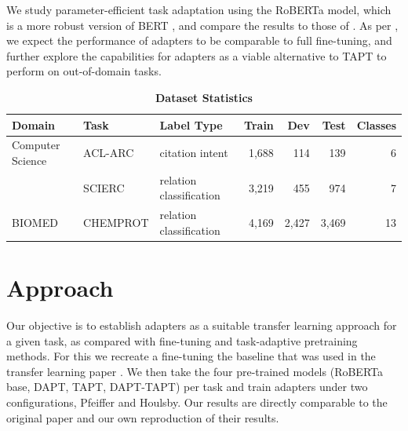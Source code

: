 \documentclass[10pt,twocolumn,letterpaper]{article}
\begin{document}
We study parameter-efficient task adaptation using the RoBERTa model, which is a more robust version of BERT \cite{liu2019roberta}, and compare the results to those of \cite{gururangan2020dont}. As per \cite{houlsby2019parameter}, we expect the performance of adapters to be comparable to full fine-tuning, and further explore the capabilities for adapters as a viable alternative to TAPT to perform on out-of-domain tasks.

\begin{table}[h]
    \centering
    \begin{tabular}{ l l l r r r r }
      \hline
      \textbf{Domain} & \textbf{Task} & \textbf{Label Type} & \textbf{Train} & \textbf{Dev}   & \textbf{Test}  & \textbf{Classes} \\
      \hline
      Computer Science & ACL-ARC & citation intent & 1,688 & 114   & 139   & 6 \\
                       & SCIERC  & relation classification & 3,219 & 455   & 974   & 7 \\
      \hline
      BIOMED           & CHEMPROT & relation classification & 4,169 & 2,427 & 3,469 & 13 \\
      \hline
    \end{tabular}%
    \caption{\textbf{Dataset Statistics}}
    \label{tab:dataset-stats}%
  \end{table}%

\section{Approach}
Our objective is to establish adapters as a suitable transfer learning approach for a given task, as compared with fine-tuning and task-adaptive pretraining methods. For this we recreate a fine-tuning the baseline that was used in the transfer learning paper \cite{gururangan2020dont}. We then take the four pre-trained models (RoBERTa base, DAPT, TAPT, DAPT-TAPT) per task and train adapters under two configurations, Pfeiffer and Houlsby. Our results are directly comparable to the original paper \cite{gururangan2020dont} and our own reproduction of their results.
\end{document}
